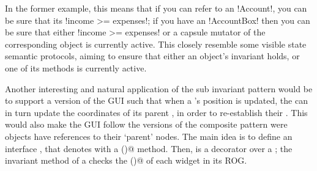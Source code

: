 In the former example, this means that
if you can refer to an \Q!Account!, you can be sure that its \Q!income >= expenses!;
if you have an \Q!AccountBox! then you can be sure that either \Q!income >= expenses! or 
a capsule mutator of the corresponding \Q@Account@ object is currently active.
This closely resemble some visible state semantic protocols, aiming to ensure that  
either an object's invariant holds, or one of its methods is currently active.


Another interesting and natural application of the sub invariant pattern would be to support a version of the GUI such that when a \Q@Widget@'s position is updated, the \Q@Widget@ can in turn update the coordinates of its parent \Q@Widget@s, in order to re-establish their \Q@subInvariants@.
This would also make the GUI follow the versions of the composite pattern were objects have references to their `parent' nodes.
The main idea is to define an interface \Q@HasSubInvariant@, that denotes \Q@Widgets@ with a \Q@subInvariant()@ method. Then, \Q@WidgetWithInvariant@ is a decorator over a \Q@Widget@; the invariant method of a \Q@WidgetWithInvariant@ checks the \Q@subInvariant()@ of each widget in its ROG.

